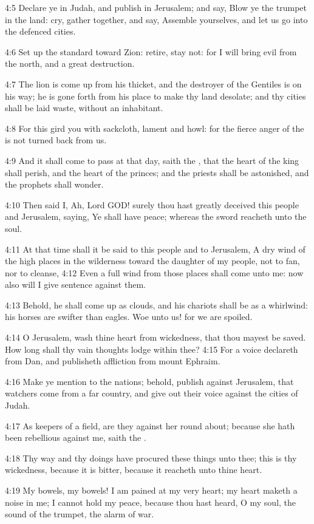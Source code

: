 4:5 Declare ye in Judah, and publish in Jerusalem; and say, Blow ye
the trumpet in the land: cry, gather together, and say, Assemble
yourselves, and let us go into the defenced cities.

4:6 Set up the standard toward Zion: retire, stay not: for I will
bring evil from the north, and a great destruction.

4:7 The lion is come up from his thicket, and the destroyer of the
Gentiles is on his way; he is gone forth from his place to make thy
land desolate; and thy cities shall be laid waste, without an
inhabitant.

4:8 For this gird you with sackcloth, lament and howl: for the fierce
anger of the \LORD is not turned back from us.

4:9 And it shall come to pass at that day, saith the \LORD, that the
heart of the king shall perish, and the heart of the princes; and the
priests shall be astonished, and the prophets shall wonder.

4:10 Then said I, Ah, Lord GOD! surely thou hast greatly deceived this
people and Jerusalem, saying, Ye shall have peace; whereas the sword
reacheth unto the soul.

4:11 At that time shall it be said to this people and to Jerusalem, A
dry wind of the high places in the wilderness toward the daughter of
my people, not to fan, nor to cleanse, 4:12 Even a full wind from
those places shall come unto me: now also will I give sentence against
them.

4:13 Behold, he shall come up as clouds, and his chariots shall be as
a whirlwind: his horses are swifter than eagles. Woe unto us! for we
are spoiled.

4:14 O Jerusalem, wash thine heart from wickedness, that thou mayest
be saved. How long shall thy vain thoughts lodge within thee?  4:15
For a voice declareth from Dan, and publisheth affliction from mount
Ephraim.

4:16 Make ye mention to the nations; behold, publish against
Jerusalem, that watchers come from a far country, and give out their
voice against the cities of Judah.

4:17 As keepers of a field, are they against her round about; because
she hath been rebellious against me, saith the \LORD.

4:18 Thy way and thy doings have procured these things unto thee; this
is thy wickedness, because it is bitter, because it reacheth unto
thine heart.

4:19 My bowels, my bowels! I am pained at my very heart; my heart
maketh a noise in me; I cannot hold my peace, because thou hast heard,
O my soul, the sound of the trumpet, the alarm of war.

